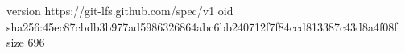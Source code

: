 version https://git-lfs.github.com/spec/v1
oid sha256:45ec87cbdb3b977ad5986326864abc6bb240712f7f84ccd813387c43d8a4f08f
size 696
